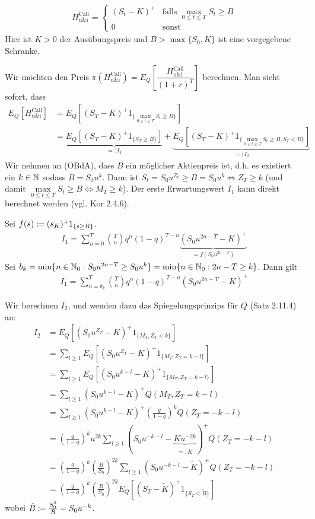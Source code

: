 \documentclass[a4paper,twoside,DIV15,BCOR12mm]{scrbook}
\begin{document}
\begin{beispiel}
\begin{align*}
H_{\text{u\&i}}^{\text{Call}} = 
\begin{cases}
(S_t-K)^+ & \text{falls }\max_{0\le t\le T}S_t \ge B \\
0 & \text{sonst}
\end{cases}
\end{align*}
Hier ist $K>0$ der Ausübungspreis und $B> \max\{S_0,K\}$ ist eine vorgegebene Schranke.

Wir möchten den Preis $\pi(H_{\text{u\&i}}^{\text{Call}})=E_Q\left[\dfrac{H_{\text{u\&i}}^{\text{Call}}}{(1+r)^T}\right]$ berechnen. Man sieht sofort, dass
\begin{align*}
E_Q[H_{\text{u\&i}}^{\text{Call}}]&=E_Q[(S_T-K)^+ 1_{\{\max\limits_{0\le t\le T} S_t\ge B\}}]\\
&=\underbrace{E_Q[(S_T-K)^+1_{\{S_T\ge B\}}]}_{=:I_1}+\underbrace{E_Q[(S_T-K)^+ 1_{\{\max\limits_{0\le t\le T} S_t\ge B,S_T<B\}}]}_{=:I_2}
\end{align*}
Wir nehmen an (OBdA), dass $B$ ein möglicher Aktienpreis ist, d.h. es existiert ein $k\in\mathbb{N}$ sodass $B=S_0u^k$. Dann ist $S_t=S_0u^{Z_t} \ge B=S_0u^k\iff Z_T\ge k$ (und damit $\max\limits_{0\le t\le T} S_t \ge B \iff M_T\ge k$).
Der erste Erwartungswert $I_1$ kann direkt berechnet werden (vgl. Kor 2.4.6).

Sei $f(s)\da(s_K)^+1_{\{s\ge B\}}$.
\begin{align*}
I_1=\sum\limits_{n=0}^T {T\choose n} q^n (1-q)^{T-n} \underbrace{(S_0u^{2n-T}-K)^+}_{=f(S_0u^{2n-T})}
\end{align*}
Sei $b_k=\min\{n\in\mathbb{N}_0:S_0u^{2n-T}\ge S_0u^k\}=\min\{n\in\mathbb{N}_0:2n-T\ge k\}$. Dann gilt
\begin{align*}
I_1=\sum\limits_{n=b_k}^T {T\choose n} q^n (1-q)^{T-n} (S_0u^{2n-T}-K)^+
\end{align*}

Wir berechnen $I_2$, und wenden dazu das Spiegelungsprinzips für $Q$ (Satz 2.11.4) an:
\begin{align*}
I_2&=E_Q[(S_0u^{Z_T}-K)^+1_{\{M_T,Z_T<k\}}]\\
&= \sum\limits_{l\ge 1}E_Q[(S_0u^{Z_T}-K)^+1_{\{M_T,Z_T=k-l\}}]\\
&= \sum\limits_{l\ge 1}E_Q[(S_0u^{k-l}-K)^+1_{\{M_T,Z_T=k-l\}}]\\
&= \sum\limits_{l\ge 1}(S_0u^{k-l}-K)^+Q(M_T,Z_T=k-l)\\
&= \sum\limits_{l\ge 1}(S_0u^{k-l}-K)^+\left(\frac{q}{1-q}\right)^kQ(Z_T=-k-l)\\
&=\left(\frac{q}{1-q}\right)^ku^{2k}\sum\limits_{l\ge 1}(S_0u^{-k-l}-\underbrace{Ku^{-2k}}_{=:\tilde{K}})^+Q(Z_T=-k-l)\\
&= \left(\frac{q}{1-q}\right)^k\left(\frac{B}{S_0}\right)^{2k}\sum\limits_{l\ge 1}(S_0u^{-k-l}-\tilde{K})^+Q(Z_T=-k-l)\\
&=\left(\frac{q}{1-q}\right)^k\left(\frac{B}{S_0}\right)^{2k} E_Q[(S_T-\tilde{K})^+1_{\{S_T<\tilde{B}\}}]
\end{align*}
wobei $\tilde{B}\da\frac{S_0^2}{B}=S_0u^{-k}$.


\end{beispiel}
\end{document}
